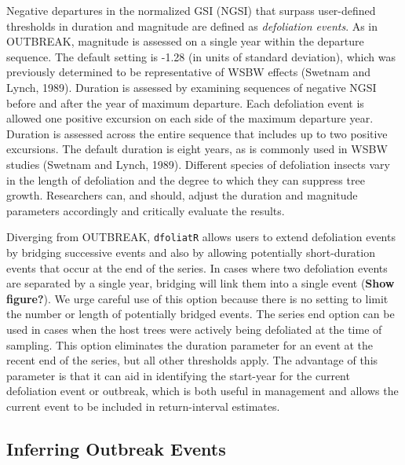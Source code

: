\documentclass[review]{elsarticle} %
\begin{document}
Negative departures in the normalized GSI (NGSI) that surpass user-defined thresholds in duration and magnitude are defined as \emph{defoliation events}. As in OUTBREAK, magnitude is assessed on a single year within the departure sequence. The default setting is -1.28 (in units of standard deviation), which was previously determined to be representative of WSBW effects (Swetnam and Lynch, 1989). Duration is assessed by examining sequences of negative NGSI before and after the year of maximum departure. Each defoliation event is allowed one positive excursion on each side of the maximum departure year. Duration is assessed across the entire sequence that includes up to two positive excursions. The default duration is eight years, as is commonly used in WSBW studies (Swetnam and Lynch, 1989). Different species of defoliation insects vary in the length of defoliation and the degree to which they can suppress tree growth. Researchers can, and should, adjust the duration and magnitude parameters accordingly and critically evaluate the results.

Diverging from OUTBREAK, \texttt{dfoliatR} allows users to extend defoliation events by bridging successive events and also by allowing potentially short-duration events that occur at the end of the series. In cases where two defoliation events are separated by a single year, bridging will link them into a single event (\textbf{Show figure?}). We urge careful use of this option because there is no setting to limit the number or length of potentially bridged events. The series end option can be used in cases when the host trees were actively being defoliated at the time of sampling. This option eliminates the duration parameter for an event at the recent end of the series, but all other thresholds apply. The advantage of this parameter is that it can aid in identifying the start-year for the current defoliation event or outbreak, which is both useful in management and allows the current event to be included in return-interval estimates.

\hypertarget{inferring-outbreak-events}{%
\subsection{Inferring Outbreak Events}\label{inferring-outbreak-events}}
\end{document}
